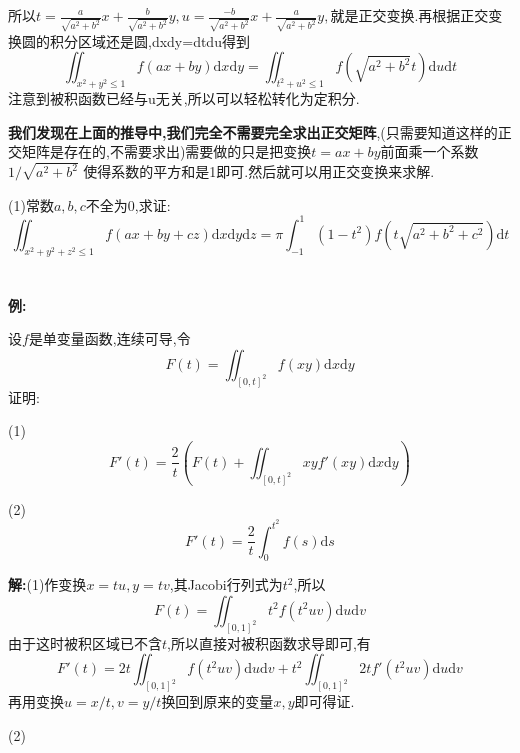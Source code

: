 \documentclass{ctexart}
\begin{document}
所以$t=\frac{a}{\sqrt{a^{2}+b^{2}}}x+\frac{b}{\sqrt{a^{2}+b^{2}}}y,u=\frac{-b}{\sqrt{a^{2}+b^{2}}}x+\frac{a}{\sqrt{a^{2}+b^{2}}}y,$就是正交变换.再根据正交变换圆的积分区域还是圆,dxdy=dtdu得到$$\iint_{x^{2}+y^{2}\leq1}f(ax+by)\mathrm{d}x\mathrm{d}y=\iint_{t^{2}+u^{2}\leq1}f(\sqrt{a^{2}+b^{2}}t)\mathrm{d}u\mathrm{d}t$$
注意到被积函数已经与u无关,所以可以轻松转化为定积分.

\textbf{我们发现在上面的推导中,我们完全不需要完全求出正交矩阵},(只需要知道这样的正交矩阵是存在的,不需要求出)需要做的只是把变换$t=ax+by$前面乘一个系数$1/\sqrt{a^{2}+b^{2}}$ 使得系数的平方和是1即可.然后就可以用正交变换来求解.

(1)常数$a,b,c$不全为0,求证:$$\iint_{x^{2}+y^{2}+z^{2}\leq1}f(ax+by+cz)\mathrm{d}x\mathrm{d}y\mathrm{d}z=\pi\int^{1}_{-1}(1-t^{2})f(t\sqrt{a^{2}+b^{2}+c^{2}})\mathrm{d}t$$

\section{}

\noindent\textbf{例:}

设$f$是单变量函数,连续可导,令$$F(t)=\iint_{[0,t]^{2}}f(xy)\mathrm{d}x\mathrm{d}y$$证明:

(1)$$F'(t)=\frac{2}{t}\left(F(t)+\iint_{[0,t]^{2}}xyf'(xy)\mathrm{d}x\mathrm{d}y\right)$$

(2)$$F'(t)=\frac{2}{t}\int_{0}^{t^{2}}f(s)\mathrm{d}s$$

\textbf{解:}(1)作变换$x=tu,y=tv$,其Jacobi行列式为$t^{2}$,所以$$F(t)=\iint_{[0,1]^{2}}t^{2}f(t^{2}uv)\mathrm{d}u\mathrm{d}v$$
由于这时被积区域已不含$t$,所以直接对被积函数求导即可,有$$F'(t)=2t\iint_{[0,1]^{2}}f(t^{2}uv)\mathrm{d}u\mathrm{d}v+t^{2}\iint_{[0,1]^{2}}2tf'(t^{2}uv)\mathrm{d}u\mathrm{d}v$$
再用变换$u=x/t,v=y/t$换回到原来的变量$x,y$即可得证.

(2)
\end{document}
